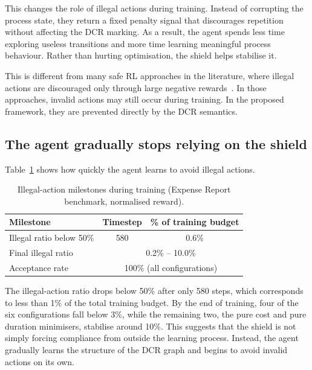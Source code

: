This changes the role of illegal actions during training. Instead of corrupting the process state, they return a fixed penalty signal that discourages repetition without affecting the \ac{DCR} marking. As a result, the agent spends less time exploring useless transitions and more time learning meaningful process behaviour. Rather than hurting optimisation, the shield helps stabilise it.

This is different from many safe \ac{RL} approaches in the literature, where illegal actions are discouraged only through large negative rewards~\cite{Guan2024Rule-basedControl, Odriozola-Olalde2025TowardsFramework, Gerold2026SafeShielding}. In those approaches, invalid actions may still occur during training. In the proposed framework, they are prevented directly by the \ac{DCR} semantics.

\subsection{The agent gradually stops relying on the shield}

Table~\ref{tab:compliance_milestones} shows how quickly the agent learns to avoid illegal actions.

\begin{table}[H]
\centering
\caption{Illegal-action milestones during training
         (Expense Report benchmark, normalised reward).}
\label{tab:compliance_milestones}
\begin{tabular}{lcc}
\toprule
\textbf{Milestone} & \textbf{Timestep} &
\textbf{\% of training budget} \\
\midrule
Illegal ratio below 50\% & 580 & 0.6\% \\

Final illegal ratio &
\multicolumn{2}{c}{0.2\% -- 10.0\%} \\

Acceptance rate &
\multicolumn{2}{c}{100\% (all configurations)} \\
\bottomrule
\end{tabular}
\end{table}

The illegal-action ratio drops below 50\% after only 580 steps, which corresponds to less than 1\% of the total training budget. By the end of training, four of the six configurations fall below 3\%, while the remaining two, the pure cost and pure duration minimisers, stabilise around 10\%. This suggests that the shield is not simply forcing compliance from outside the learning process. Instead, the agent gradually learns the structure of the \ac{DCR} graph and begins to avoid invalid actions on its own.

